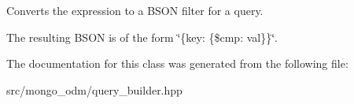 Converts the expression to a B\+S\+ON filter for a query. 

The resulting B\+S\+ON is of the form \char`\"{}\{key\+: \{\$cmp\+: val\}\}\char`\"{}. 

The documentation for this class was generated from the following file\+:\begin{DoxyCompactItemize}
\item 
src/mongo\+\_\+odm/query\+\_\+builder.\+hpp\end{DoxyCompactItemize}
